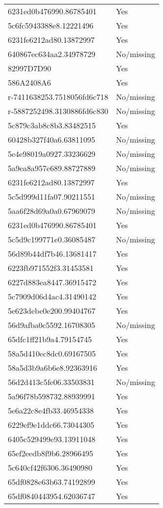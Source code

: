 \begin{tabular}{ll}
6231ed0b476990.86785401 & Yes \\
5c6fc5943388e8.12221496 & Yes \\
6231fe6212ad80.13872997 & Yes \\
640867ec634aa2.34978729 & No/missing \\
82997D7D90 & Yes \\
586A2408A6 & Yes \\
r-7411638253.7518056fd6c718 & No/missing \\
r-5887252498.3130886fd6c830 & No/missing \\
5c879c3ab8c8b3.83482515 & Yes \\
60428b327f40a6.63811095 & No/missing \\
5e4e98019a0927.33236629 & No/missing \\
5a9ea8a957e689.88727889 & No/missing \\
6231fe6212ad80.13872997 & Yes \\
5c5d999d11fa07.90211551 & No/missing \\
5aa6f28d69a0a0.67969079 & No/missing \\
6231ed0b476990.86785401 & Yes \\
5c5d9c199771e0.36085487 & No/missing \\
56d89b44df7b46.13681417 & Yes \\
6223fb971552f3.31453581 & Yes \\
6227d883ea8447.36915472 & Yes \\
5c7909d06d4ac4.31490142 & Yes \\
5e623debe0e200.99404767 & Yes \\
56d9afba0c5592.16708305 & No/missing \\
65dfc1ff21b9a4.79154745 & Yes \\
58a5d410ec8dc0.69167505 & Yes \\
58a5d3b9a6b6e8.92363916 & Yes \\
56d2d413c5fe06.33503831 & No/missing \\
5a96f78b598732.88939991 & Yes \\
5e6a22c8e4fb33.46954338 & Yes \\
6229ef9e1ddc66.73044305 & Yes \\
6405c529499e93.13911048 & Yes \\
65ef2eedb8f9b6.28966495 & Yes \\
5c640cf42f6306.36490980 & Yes \\
65df0828e63b63.74192899 & Yes \\
65df0840443954.62036747 & Yes \\

\end{tabular}
